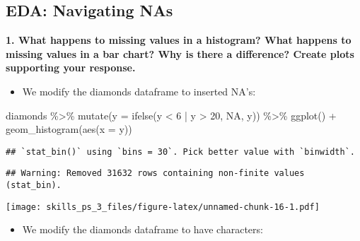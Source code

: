 \documentclass[
]{article}
\newenvironment{Shaded}{\begin{snugshade}}{\end{snugshade}}
\newcommand{\AttributeTok}[1]{\textcolor[rgb]{0.77,0.63,0.00}{#1}}
\newcommand{\ConstantTok}[1]{\textcolor[rgb]{0.00,0.00,0.00}{#1}}
\newcommand{\DecValTok}[1]{\textcolor[rgb]{0.00,0.00,0.81}{#1}}
\newcommand{\FunctionTok}[1]{\textcolor[rgb]{0.00,0.00,0.00}{#1}}
\newcommand{\NormalTok}[1]{#1}
\newcommand{\OtherTok}[1]{\textcolor[rgb]{0.56,0.35,0.01}{#1}}
\newcommand{\SpecialCharTok}[1]{\textcolor[rgb]{0.00,0.00,0.00}{#1}}
\newcommand{\StringTok}[1]{\textcolor[rgb]{0.31,0.60,0.02}{#1}}
\providecommand{\tightlist}{%
  \setlength{\itemsep}{0pt}\setlength{\parskip}{0pt}}
\begin{document}
\pagebreak

\hypertarget{eda-navigating-nas}{%
\subsection{EDA: Navigating NAs}\label{eda-navigating-nas}}

\textbf{1. What happens to missing values in a histogram? What happens
to missing values in a bar chart? Why is there a difference? Create
plots supporting your response.}

\begin{itemize}
\tightlist
\item
  We modify the diamonds dataframe to inserted NA's:
\end{itemize}

\begin{Shaded}
\begin{Highlighting}[]
\NormalTok{diamonds }\SpecialCharTok{\%\textgreater{}\%} 
  \FunctionTok{mutate}\NormalTok{(}\AttributeTok{y =} \FunctionTok{ifelse}\NormalTok{(y }\SpecialCharTok{\textless{}} \DecValTok{6} \SpecialCharTok{|}\NormalTok{ y }\SpecialCharTok{\textgreater{}} \DecValTok{20}\NormalTok{, }\ConstantTok{NA}\NormalTok{, y)) }\SpecialCharTok{\%\textgreater{}\%} 
  \FunctionTok{ggplot}\NormalTok{() }\SpecialCharTok{+} 
  \FunctionTok{geom\_histogram}\NormalTok{(}\FunctionTok{aes}\NormalTok{(}\AttributeTok{x =}\NormalTok{ y))}
\end{Highlighting}
\end{Shaded}

\begin{verbatim}
## `stat_bin()` using `bins = 30`. Pick better value with `binwidth`.
\end{verbatim}

\begin{verbatim}
## Warning: Removed 31632 rows containing non-finite values (stat_bin).
\end{verbatim}

\texttt{[image: skills\_ps\_3\_files/figure-latex/unnamed-chunk-16-1.pdf]}

\begin{itemize}
\tightlist
\item
  We modify the diamonds dataframe to have characters:
\end{itemize}

\begin{Shaded}
\end{Shaded}
\end{document}
